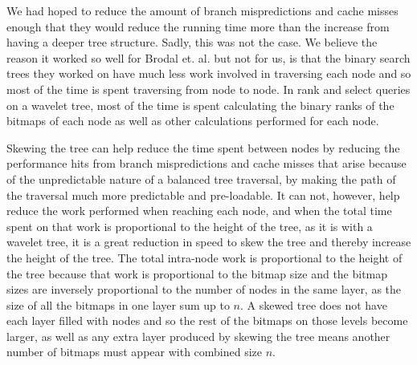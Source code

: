 We had hoped to reduce the amount of branch mispredictions and cache misses enough that they would reduce the running time more than the increase from having a deeper tree structure.
Sadly, this was not the case. We believe the reason it worked so well for Brodal et. al. but not for us, is that the binary search trees they worked on have much less work involved in traversing each node and so most of the time is spent traversing from node to node.
In rank and select queries on a wavelet tree, most of the time is spent calculating the binary ranks of the bitmaps of each node as well as other calculations performed for each node.

Skewing the tree can help reduce the time spent between nodes by reducing the performance hits from branch mispredictions and cache misses that arise because of the unpredictable nature of a balanced tree traversal, by making the path of the traversal much more predictable and pre-loadable.
It can not, however, help reduce the work performed when reaching each node, and when the total time spent on that work is proportional to the height of the tree, as it is with a wavelet tree, it is a great reduction in speed to skew the tree and thereby increase the height of the tree.
The total intra-node work is proportional to the height of the tree because that work is proportional to the bitmap size and the bitmap sizes are inversely proportional to the number of nodes in the same layer, as the size of all the bitmaps in one layer sum up to $n$. A skewed tree does not have each layer filled with nodes and so the rest of the bitmaps on those levels become larger, as well as any extra layer produced by skewing the tree means another number of bitmaps must appear with combined size $n$.


